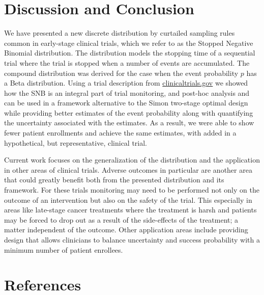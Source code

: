 \documentclass[12pt]{article}         %
\begin{document}
\section{Discussion and Conclusion}

We have presented a new discrete distribution by curtailed sampling rules common in early-stage clinical trials, which we refer to as the Stopped Negative Binomial distribution. The distribution models the stopping time of a sequential trial where the trial is stopped when a number of events are accumulated. The compound distribution was derived for the case when the event probability $p$ has a Beta distribution. Using a trial description from \url{clinicaltrials.gov} we showed how the SNB is an integral part of trial monitoring, and post-hoc analysis and can be used in a framework alternative to the Simon two-stage optimal design while providing better estimates of the event probability along with quantifying the uncertainty associated with the estimates. As a result, we were able to show fewer patient enrollments and achieve the same estimates, with added  in a hypothetical, but representative, clinical trial.

Current work focuses on the generalization of the distribution and the application in other areas of clinical trials. Adverse outcomes in particular are another area that could greatly benefit both from the presented distribution and its framework. For these trials monitoring may need to be performed not only on the outcome of an intervention but also on the safety of the trial. This especially in areas like late-stage cancer treatments where the treatment is harsh and patients may be forced to drop out as a result of the side-effects of the treatment; a matter independent of the outcome. Other application areas include providing design that allows clinicians to balance uncertainty and success probability with a minimum number of patient enrollees.



\section*     {\bf References}
\end{document}
